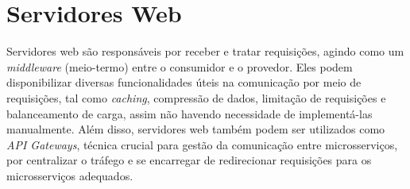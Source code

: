 



\section{Servidores Web}
Servidores web são responsáveis por receber e tratar requisições, agindo como um \emph{middleware} (meio-termo) entre o consumidor e o provedor. Eles podem disponibilizar diversas funcionalidades úteis na comunicação por meio de requisições, tal como \emph{caching}, compressão de dados, limitação de requisições e balanceamento de carga, assim não havendo necessidade de implementá-las manualmente. Além disso, servidores web também podem ser utilizados como \emph{API Gateways}, técnica crucial para gestão da comunicação entre microsserviços, por centralizar o tráfego e se encarregar de redirecionar requisições para os microsserviços adequados. 

